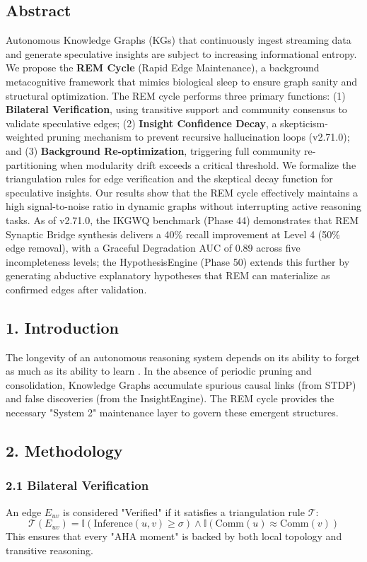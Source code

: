 
\subsection*{Abstract}
Autonomous Knowledge Graphs (KGs) that continuously ingest streaming data and generate speculative insights are subject to increasing informational entropy. We propose the \textbf{REM Cycle} (Rapid Edge Maintenance), a background metacognitive framework that mimics biological sleep to ensure graph sanity and structural optimization. The REM cycle performs three primary functions: (1) \textbf{Bilateral Verification}, using transitive support and community consensus to validate speculative edges; (2) \textbf{Insight Confidence Decay}, a skepticism-weighted pruning mechanism to prevent recursive hallucination loops (v2.71.0); and (3) \textbf{Background Re-optimization}, triggering full community re-partitioning when modularity drift exceeds a critical threshold. We formalize the triangulation rules for edge verification and the skeptical decay function for speculative insights. Our results show that the REM cycle effectively maintains a high signal-to-noise ratio in dynamic graphs without interrupting active reasoning tasks. As of v2.71.0, the IKGWQ benchmark (Phase 44) demonstrates that REM Synaptic Bridge synthesis delivers a 40\% recall improvement at Level 4 (50\% edge removal), with a Graceful Degradation AUC of 0.89 across five incompleteness levels; the HypothesisEngine (Phase 50) extends this further by generating abductive explanatory hypotheses that REM can materialize as confirmed edges after validation.

\subsection*{1. Introduction}
The longevity of an autonomous reasoning system depends on its ability to forget as much as its ability to learn \cite{diekelmann2010memory}. In the absence of periodic pruning and consolidation, Knowledge Graphs accumulate spurious causal links (from STDP) and false discoveries (from the InsightEngine). The REM cycle provides the necessary "System 2" maintenance layer to govern these emergent structures.

\subsection*{2. Methodology}

\subsubsection*{2.1 Bilateral Verification}
An edge $E_{uv}$ is considered "Verified" if it satisfies a triangulation rule $\mathcal{T}$:
$$\mathcal{T}(E_{uv}) = \mathbb{I}(\text{Inference}(u,v) \geq \sigma) \land \mathbb{I}(\text{Comm}(u) \approx \text{Comm}(v))$$
This ensures that every "AHA moment" is backed by both local topology and transitive reasoning.

